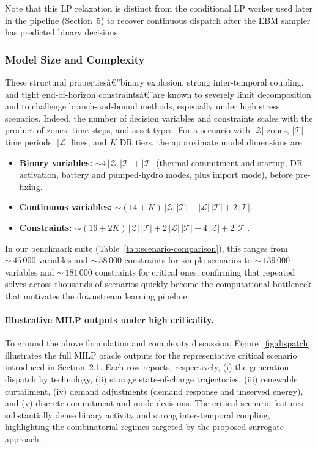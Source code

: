 \documentclass{article}
\begin{document}
Note that this LP relaxation is distinct from the conditional LP worker used later in the pipeline (Section~5) to recover continuous dispatch after the EBM sampler has predicted binary decisions.


\subsubsection{Model Size and Complexity}
\label{sec:milp_size}
These structural propertiesâ€”binary explosion, strong inter-temporal coupling, and tight end-of-horizon constraintsâ€”are known to severely limit decomposition and to challenge branch-and-bound methods, especially under high stress scenarios.
Indeed, the number of decision variables and constraints scales with the product of zones, time steps, and asset types. For a scenario with $|\mathcal{Z}|$ zones, $|\mathcal{T}|$ time periods, $|\mathcal{L}|$ lines, and $K$ DR tiers, the approximate model dimensions are:
\begin{itemize}[noitemsep]
  \item \textbf{Binary variables:} $\sim 4\,|\mathcal{Z}|\,|\mathcal{T}| + |\mathcal{T}|$ (thermal commitment and startup, DR activation, battery and pumped-hydro modes, plus import mode), before pre-fixing.
  \item \textbf{Continuous variables:} $\sim (14 + K)\,|\mathcal{Z}|\,|\mathcal{T}| + |\mathcal{L}|\,|\mathcal{T}| + 2\,|\mathcal{T}|$.
  \item \textbf{Constraints:} $\sim (16 + 2K)\,|\mathcal{Z}|\,|\mathcal{T}| + 2\,|\mathcal{L}|\,|\mathcal{T}| + 4\,|\mathcal{Z}| + 2\,|\mathcal{T}|$.
\end{itemize}
In our benchmark suite (Table~\ref{tab:scenario-comparison}), this ranges from ${\sim}\,45\,000$ variables and ${\sim}\,58\,000$ constraints for simple scenarios to ${\sim}\,139\,000$ variables and ${\sim}\,181\,000$ constraints for critical ones, confirming that repeated solves across thousands of scenarios quickly become the computational bottleneck that motivates the downstream learning pipeline.

\paragraph{Illustrative MILP outputs under high criticality.}
To ground the above formulation and complexity discussion, Figure~\ref{fig:dispatch}
illustrates the full MILP oracle outputs for the representative critical scenario introduced in Section~2.1. Each row reports, respectively, (i) the generation dispatch by technology, (ii) storage state-of-charge trajectories, (iii) renewable curtailment, (iv) demand adjustments
(demand response and unserved energy), and (v) discrete commitment and mode decisions. The critical scenario features substantially dense binary activity and strong inter-temporal coupling, highlighting the combinatorial regimes targeted by the proposed surrogate approach.
\end{document}
